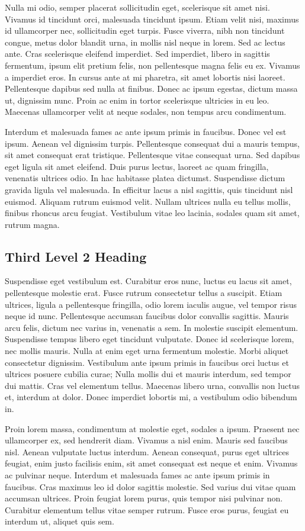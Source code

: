 Nulla mi odio, semper placerat sollicitudin eget, scelerisque sit amet nisi. Vivamus id tincidunt orci, malesuada tincidunt ipsum. Etiam velit nisi, maximus id ullamcorper nec, sollicitudin eget turpis. Fusce viverra, nibh non tincidunt congue, metus dolor blandit urna, in mollis nisl neque in lorem. Sed ac lectus ante. Cras scelerisque eleifend imperdiet. Sed imperdiet, libero in sagittis fermentum, ipsum elit pretium felis, non pellentesque magna felis eu ex. Vivamus a imperdiet eros. In cursus ante at mi pharetra, sit amet lobortis nisi laoreet. Pellentesque dapibus sed nulla at finibus. Donec ac ipsum egestas, dictum massa ut, dignissim nunc. Proin ac enim in tortor scelerisque ultricies in eu leo. Maecenas ullamcorper velit at neque sodales, non tempus arcu condimentum.

Interdum et malesuada fames ac ante ipsum primis in faucibus. Donec vel est ipsum. Aenean vel dignissim turpis. Pellentesque consequat dui a mauris tempus, sit amet consequat erat tristique. Pellentesque vitae consequat urna. Sed dapibus eget ligula sit amet eleifend. Duis purus lectus, laoreet ac quam fringilla, venenatis ultrices odio. In hac habitasse platea dictumst. Suspendisse dictum gravida ligula vel malesuada. In efficitur lacus a nisl sagittis, quis tincidunt nisl euismod. Aliquam rutrum euismod velit. Nullam ultrices nulla eu tellus mollis, finibus rhoncus arcu feugiat. Vestibulum vitae leo lacinia, sodales quam sit amet, rutrum magna.

\subsection{Third Level 2 Heading}

Suspendisse eget vestibulum est. Curabitur eros nunc, luctus eu lacus sit amet, pellentesque molestie erat. Fusce rutrum consectetur tellus a suscipit. Etiam ultrices, ligula a pellentesque fringilla, odio lorem iaculis augue, vel tempor risus neque id nunc. Pellentesque accumsan faucibus dolor convallis sagittis. Mauris arcu felis, dictum nec varius in, venenatis a sem. In molestie suscipit elementum. Suspendisse tempus libero eget tincidunt vulputate. Donec id scelerisque lorem, nec mollis mauris. Nulla at enim eget urna fermentum molestie. Morbi aliquet consectetur dignissim. Vestibulum ante ipsum primis in faucibus orci luctus et ultrices posuere cubilia curae; Nulla mollis dui et mauris interdum, sed tempor dui mattis. Cras vel elementum tellus. Maecenas libero urna, convallis non luctus et, interdum at dolor. Donec imperdiet lobortis mi, a vestibulum odio bibendum in.

Proin lorem massa, condimentum at molestie eget, sodales a ipsum. Praesent nec ullamcorper ex, sed hendrerit diam. Vivamus a nisl enim. Mauris sed faucibus nisl. Aenean vulputate luctus interdum. Aenean consequat, purus eget ultrices feugiat, enim justo facilisis enim, sit amet consequat est neque et enim. Vivamus ac pulvinar neque. Interdum et malesuada fames ac ante ipsum primis in faucibus. Cras maximus leo id dolor sagittis molestie. Sed varius dui vitae quam accumsan ultrices. Proin feugiat lorem purus, quis tempor nisi pulvinar non. Curabitur elementum tellus vitae semper rutrum. Fusce eros purus, feugiat eu interdum ut, aliquet quis sem.
